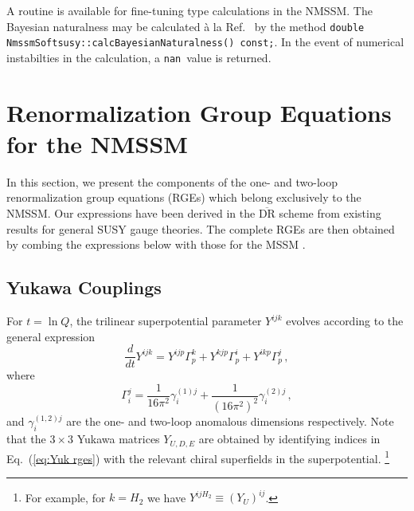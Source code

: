 \documentclass[final,3p,times]{elsarticle}
\def\code#1{\small{\tt #1}\normalsize}
\newcommand{\dt}{\frac{d}{dt}}
\begin{document}
A routine is available for fine-tuning type calculations in the NMSSM. The
Bayesian naturalness may be calculated \`{a} la Ref.~\cite{1709.07895} by the
method \code{double NmssmSoftsusy::calcBayesianNaturalness() const;}. In the
event of numerical instabilties in the calculation, a \code{nan}\ value is
returned. 

\section{Renormalization Group Equations for the NMSSM}\label{sec:RGEs}
In this section, we present the components of the one- and two-loop renormalization group equations (RGEs) which belong exclusively to the NMSSM.  Our expressions have been derived in the $\overline{\mbox{DR}}$ scheme from existing results \cite{MV94,Yam94} for general SUSY gauge theories. The complete RGEs are then obtained by combing the expressions below with those for the MSSM \cite{MV94}.

\subsection{Yukawa Couplings}
For $t = \ln Q$, the trilinear superpotential parameter $Y^{ijk}$ evolves 
according to the general expression \cite{MV94}
%
\begin{equation}
\dt Y^{ijk} = Y^{ijp}\Gamma_p^k + Y^{kjp}\Gamma_p^i + Y^{ikp}\Gamma_p^j\,,
\label{eq:Yuk rges}
\end{equation}
%
where 
%
\begin{equation}
\Gamma_i^j = \frac{1}{16\pi^2}\gamma_i^{(1)j} 
+ \frac{1}{(16\pi^2)^2}\gamma_{i}^{(2)j}\,, 
\end{equation}
%
and $\gamma^{(1,2)j}_i$ are the one- and two-loop anomalous dimensions 
respectively.  Note that the $3\times 3$ Yukawa matrices $Y_{U,D,E}$ are 
obtained by identifying indices in Eq.~(\ref{eq:Yuk rges}) with the relevant chiral superfields in the superpotential.%
\footnote{For example, for $k=H_2$ we have $Y^{ijH_2}\equiv (Y_U)^{ij}$.}  
\end{document}
